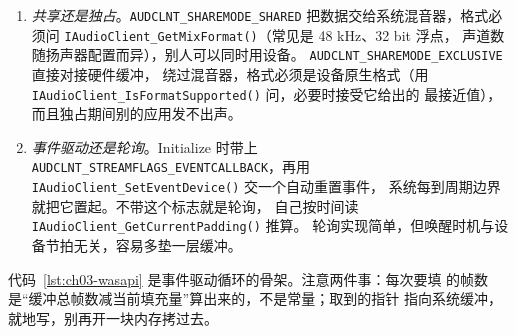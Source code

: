 \documentclass[12pt,a4paper,fontset=fandol]{ctexbook}
\newcommand{\Fn}[1]{\texttt{#1()}}
\newcommand{\Tp}[1]{\texttt{#1}}
\begin{document}
\begin{enumerate}
  \item \emph{共享还是独占}。\Tp{AUDCLNT\_SHAREMODE\_SHARED}
        把数据交给系统混音器，格式必须问
        \Fn{IAudioClient\_GetMixFormat}（常见是 48 kHz、32 bit 浮点，
        声道数随扬声器配置而异），别人可以同时用设备。
        \Tp{AUDCLNT\_SHAREMODE\_EXCLUSIVE} 直接对接硬件缓冲，
        绕过混音器，格式必须是设备原生格式（用
        \Fn{IAudioClient\_IsFormatSupported} 问，必要时接受它给出的
        最接近值），而且独占期间别的应用发不出声。
  \item \emph{事件驱动还是轮询}。Initialize 时带上
        \Tp{AUDCLNT\_STREAMFLAGS\_EVENTCALLBACK}，再用
        \Fn{IAudioClient\_SetEventDevice} 交一个自动重置事件，
        系统每到周期边界就把它置起。不带这个标志就是轮询，
        自己按时间读 \Fn{IAudioClient\_GetCurrentPadding} 推算。
        轮询实现简单，但唤醒时机与设备节拍无关，容易多垫一层缓冲。
\end{enumerate}

代码~\ref{lst:ch03-wasapi} 是事件驱动循环的骨架。注意两件事：每次要填
的帧数是``缓冲总帧数减当前填充量''算出来的，不是常量；取到的指针
指向系统缓冲，就地写，别再开一块内存拷过去。
\end{document}

